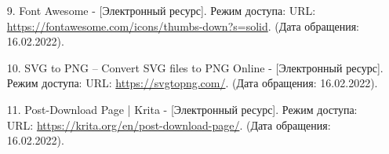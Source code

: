 \documentclass[12pt, a4paper, simple]{eskdtext}
\begin{document}
\begin{enumerate}
        \item[9.] Font Awesome
        - [Электронный ресурс]. Режим доступа:
        URL: \url{https://fontawesome.com/icons/thumbs-down?s=solid}.
        (Дата обращения: 16.02.2022).

        \item[10.] SVG to PNG – Convert SVG files to PNG Online
        - [Электронный ресурс]. Режим доступа:
        URL: \url{https://svgtopng.com/}.
        (Дата обращения: 16.02.2022).

        \item[11.] Post-Download Page | Krita
        - [Электронный ресурс]. Режим доступа:
        URL: \url{https://krita.org/en/post-download-page/}.
        (Дата обращения: 16.02.2022).
        
    \end{enumerate}
\end{document}

